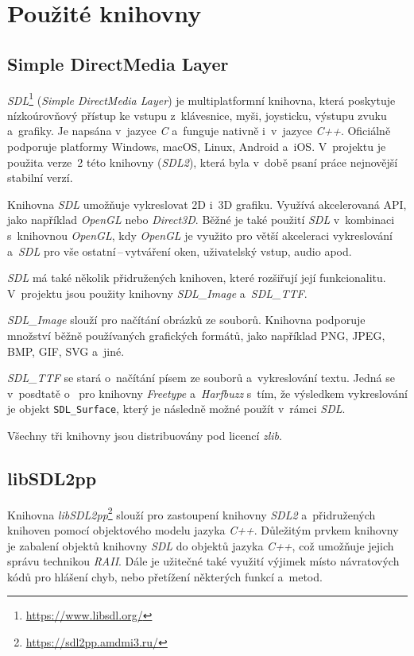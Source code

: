 \section{Použité knihovny}

\subsection*{Simple DirectMedia Layer}

\emph{SDL}\footnote{\url{https://www.libsdl.org/}} (\emph{Simple DirectMedia Layer}) je multiplatformní knihovna, která poskytuje nízkoúrovňový přístup ke vstupu z~klávesnice, myši, joysticku, výstupu zvuku a~grafiky. Je napsána v~jazyce \emph{C} a~funguje nativně i~v~jazyce \emph{C++}. Oficiálně podporuje platformy Windows, macOS, Linux, Android a~iOS. V~projektu je použita verze~2 této knihovny (\emph{SDL2}), která byla v~době psaní práce nejnovější stabilní verzí.

Knihovna \emph{SDL} umožňuje vykreslovat 2D i~3D grafiku. Využívá akcelerovaná API, jako například \emph{OpenGL} nebo \emph{Direct3D}. Běžné je také použití \emph{SDL} v~kombinaci s~knihovnou \emph{OpenGL}, kdy \emph{OpenGL} je využito pro větší akceleraci vykreslování a~\emph{SDL} pro vše ostatní\,--\,vytváření oken, uživatelský vstup, audio apod.

\emph{SDL} má také několik přidružených knihoven, které rozšiřují její funkcionalitu. V~projektu jsou použity knihovny \emph{SDL\_Image} a~\emph{SDL\_TTF}.

\emph{SDL\_Image} slouží pro načítání obrázků ze souborů. Knihovna podporuje množství běžně používaných grafických formátů, jako například PNG, JPEG, BMP, GIF, SVG a~jiné.

\emph{SDL\_TTF} se stará o~načítání písem ze souborů a~vykreslování textu. Jedná se v~posdtatě o~ pro knihovny \emph{Freetype} a~\emph{Harfbuzz} s~tím, že výsledkem vykreslování je objekt \texttt{SDL\_Surface}, který je následně možné použít v~rámci \emph{SDL}.

Všechny tři knihovny jsou distribuovány pod licencí \emph{zlib}.

\subsection*{libSDL2pp}

Knihovna \emph{libSDL2pp}\footnote{\url{https://sdl2pp.amdmi3.ru/}} slouží pro zastoupení knihovny \emph{SDL2} a~přidružených knihoven pomocí objektového modelu jazyka \emph{C++}. Důležitým prvkem knihovny je zabalení objektů knihovny \emph{SDL} do objektů jazyka \emph{C++}, což umožňuje jejich správu technikou \emph{RAII}. Dále je užitečné také využití výjimek místo návratových kódů pro hlášení chyb, nebo přetížení některých funkcí a~metod.

